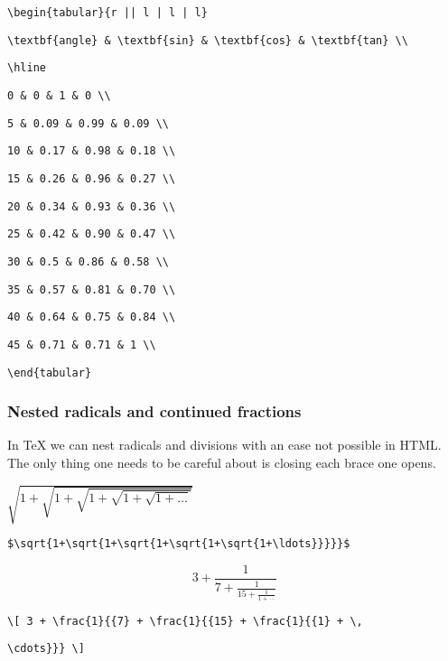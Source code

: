 \smallskip

\verb"\begin{tabular}{r || l | l | l}"

\verb"\textbf{angle} & \textbf{sin} & \textbf{cos} & \textbf{tan} \\"

\verb"\hline"

\verb"0 & 0 & 1 & 0 \\"

\verb"5 & 0.09 & 0.99 & 0.09 \\"

\verb"10 & 0.17 & 0.98 & 0.18 \\"

\verb"15 & 0.26 & 0.96 & 0.27 \\"

\verb"20 & 0.34 & 0.93 & 0.36 \\"

\verb"25 & 0.42 & 0.90 & 0.47 \\"

\verb"30 & 0.5 & 0.86 & 0.58 \\"

\verb"35 & 0.57 & 0.81 & 0.70 \\"

\verb"40 & 0.64 & 0.75 & 0.84 \\"

\verb"45 & 0.71 & 0.71 & 1 \\"

\verb"\end{tabular}"

\subsubsection{Nested radicals and continued fractions}

In \TeX{} we can nest radicals and divisions with an ease not possible in HTML. The only thing one needs to be careful about is closing each brace one opens.

\medskip

$\sqrt{1+\sqrt{1+\sqrt{1+\sqrt{1+\sqrt{1+\ldots}}}}}$

\smallskip

\verb'$\sqrt{1+\sqrt{1+\sqrt{1+\sqrt{1+\sqrt{1+\ldots}}}}}$'

\[ 3 + \frac{1}{{7} + \frac{1}{{15} + \frac{1}{{1} + \, \cdots}}} \]

\verb'\[ 3 + \frac{1}{{7} + \frac{1}{{15} + \frac{1}{{1} + \,'

\verb'\cdots}}} \]'

